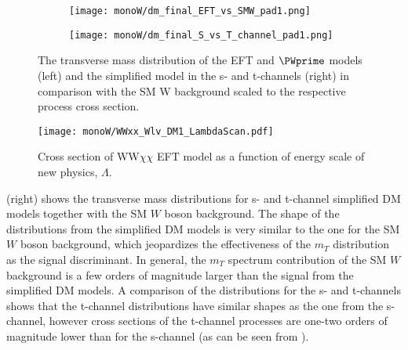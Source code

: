 \begin{figure}[]
\begin{subfigure}{.5\textwidth}
  \centering
  \texttt{[image: monoW/dm\_final\_EFT\_vs\_SMW\_pad1.png]}
\end{subfigure}%
\begin{subfigure}{.5\textwidth}
  \centering
  \texttt{[image: monoW/dm\_final\_S\_vs\_T\_channel\_pad1.png]} 
\end{subfigure}
\caption{The transverse mass distribution
of the EFT and $\PWprime$ models (left) and the simplified model in the s- and t-channels (right) in comparison with the SM W background scaled to the respective process cross section.}
  \label{fig:scaledKin}
\end{figure}

\begin{figure}[]
 \texttt{[image: monoW/WWxx\_Wlv\_DM1\_LambdaScan.pdf]}
  \caption{Cross section of WW$\chi\chi$ EFT model as a function of energy scale of new physics, $\Lambda$.}
  \label{fig:lambdaScan}
\end{figure}

 (right) shows the transverse mass distributions for s- and t-channel simplified DM models together with the SM $W$ boson background.
The shape of the distributions from the simplified DM models is very similar to the one for the SM $W$ boson background, which jeopardizes the effectiveness of the $m_T$ distribution as the signal discriminant. In general, the $m_T$ spectrum contribution of the SM $W$ background is
a few orders of magnitude larger than the signal from the simplified DM models.
A comparison of the distributions for the s- and t-channels shows that the t-channel distributions
have similar shapes as the one from the s-channel, however cross sections of the t-channel 
processes are one-two orders of magnitude lower than for the s-channel (as can be seen from ).






